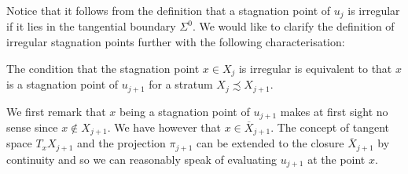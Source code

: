 Notice that it follows from the definition that a stagnation point of $u_j$ is irregular if it
lies in the tangential boundary $\Sigma^0$.
We would like to clarify the definition of irregular stagnation points further with the following characterisation:
\begin{proposition}\label{pr:characterisation_irregular_bd}
  The condition that the stagnation point $x\in X_j$ is irregular is equivalent to that
  $x$ is a stagnation point of $u_{j+1}$ for a stratum $X_j\precsim X_{j+1}$.
\end{proposition}
We first remark that $x$ being a stagnation point of $u_{j+1}$ makes at first sight no sense since $x\notin X_{j+1}$.
We have however that $x\in\overline{X}_{j+1}$. The concept of tangent space $T_xX_{j+1}$ and the projection $\pi_{j+1}$
can be extended to the closure $\overline{X}_{j+1}$ by continuity and so we can reasonably speak of evaluating $u_{j+1}$ at the point $x$.
